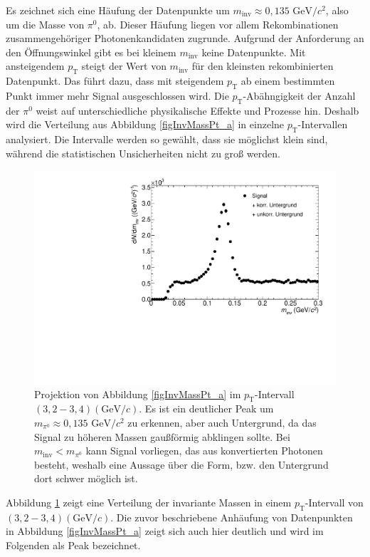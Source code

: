 Es zeichnet sich eine H\"aufung der Datenpunkte um $m_{\text{inv}}\approx 0,135\text{ GeV}/c^{2}$, also um die Masse von $\pi^{0}$, ab.
Dieser H\"aufung liegen vor allem Rekombinationen zusammengeh\"origer Photonenkandidaten zugrunde.
Aufgrund der Anforderung an den \"Offnungswinkel gibt es bei kleinem $m_{\text{inv}}$ keine Datenpunkte.
Mit ansteigendem $p_{\text{T}}$ steigt der Wert von $m_{\text{inv}}$ f\"ur den kleinsten rekombinierten Datenpunkt.
Das f\"uhrt dazu, dass mit steigendem $p_{\text{T}}$ ab einem bestimmten Punkt immer mehr Signal ausgeschlossen wird.
\newline
Die $p_{\text{T}}$-Ab\"ahngigkeit der Anzahl der $\pi^{0}$ weist auf unterschiedliche physikalische Effekte und Prozesse hin.
Deshalb wird die Verteilung aus Abbildung \ref{figInvMassPt_a} in einzelne $p_{\text{T}}$-Intervallen analysiert.
Die Intervalle werden so gew{\"a}hlt, dass sie m{\"o}glichst klein sind, w{\"a}hrend die statistischen Unsicherheiten nicht zu gro{\ss} werden.
\begin{figure}[tbp]
\centering
\includegraphics[width=.75\linewidth]{hSignalPlusBkg.pdf}
\caption{Projektion von Abbildung \ref{figInvMassPt_a} im $p_{\text{T}}$-Intervall $(3,2 - 3,4) (\text{GeV/}c)$. Es ist ein deutlicher Peak um $m_{\pi^{0}} \approx 0,135\text{ GeV/}c^{2}$ zu erkennen, aber auch Untergrund, da das Signal zu h{\"o}heren Massen gau{\ss}f{\"o}rmig abklingen sollte. Bei $m_{\text{inv}} < m_{\pi^{0}}$ kann Signal vorliegen, das aus konvertierten Photonen besteht, weshalb eine Aussage {\"u}ber die Form, bzw. den Untergrund dort schwer m{\"o}glich ist.}
\label{figSignalPlusBkg}
\end{figure}
\newline
Abbildung \ref{figSignalPlusBkg} zeigt eine Verteilung der invariante Massen in einem $p_{\text{T}}$-Intervall von $(3,2 - 3,4)(\text{GeV}/c)$.
Die zuvor beschriebene Anh\"aufung von Datenpunkten in Abbildung \ref{figInvMassPt_a} zeigt sich auch hier deutlich und wird im Folgenden als Peak bezeichnet.
